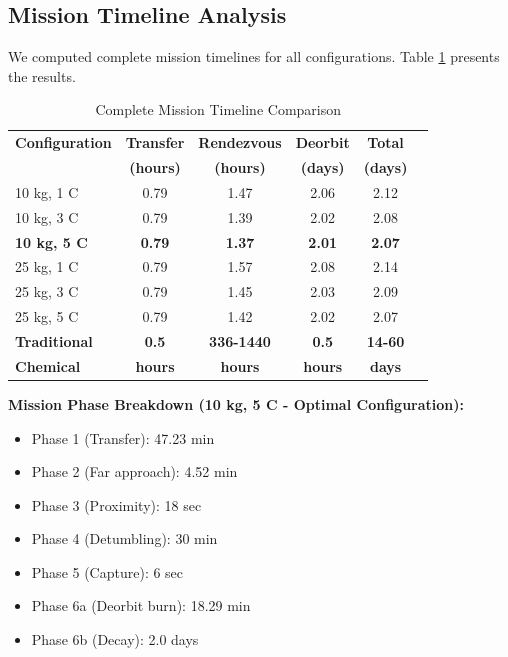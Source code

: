 \documentclass[12pt,a4paper]{article}
\begin{document}
\subsection{Mission Timeline Analysis}

We computed complete mission timelines for all configurations. Table \ref{tab:mission_timeline} presents the results.

\begin{table}[H]
\centering
\caption{Complete Mission Timeline Comparison}
\label{tab:mission_timeline}
\begin{tabular}{@{}lccccc@{}}
\toprule
\textbf{Configuration} & \textbf{Transfer} & \textbf{Rendezvous} & \textbf{Deorbit} & \textbf{Total} \\
                       & \textbf{(hours)}  & \textbf{(hours)}    & \textbf{(days)}  & \textbf{(days)} \\ \midrule
10 kg, 1 C & 0.79 & 1.47 & 2.06 & 2.12 \\
10 kg, 3 C & 0.79 & 1.39 & 2.02 & 2.08 \\
\textbf{10 kg, 5 C} & \textbf{0.79} & \textbf{1.37} & \textbf{2.01} & \textbf{2.07} \\
25 kg, 1 C & 0.79 & 1.57 & 2.08 & 2.14 \\
25 kg, 3 C & 0.79 & 1.45 & 2.03 & 2.09 \\
25 kg, 5 C & 0.79 & 1.42 & 2.02 & 2.07 \\ \midrule
\textbf{Traditional} & \textbf{0.5} & \textbf{336-1440} & \textbf{0.5} & \textbf{14-60} \\
\textbf{Chemical}    & \textbf{hours} & \textbf{hours} & \textbf{hours} & \textbf{days} \\ \bottomrule
\end{tabular}
\end{table}

\textbf{Mission Phase Breakdown (10 kg, 5 C - Optimal Configuration):}

\begin{itemize}
\item Phase 1 (Transfer): 47.23 min
\item Phase 2 (Far approach): 4.52 min
\item Phase 3 (Proximity): 18 sec
\item Phase 4 (Detumbling): 30 min
\item Phase 5 (Capture): 6 sec
\item Phase 6a (Deorbit burn): 18.29 min
\item Phase 6b (Decay): 2.0 days
\end{itemize}
\end{document}
